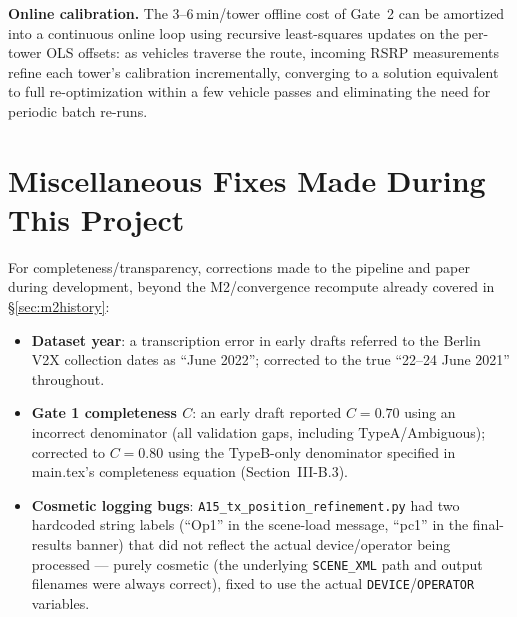 \documentclass[11pt]{article}
\begin{document}
\textbf{Online calibration.} The 3--6\,min/tower offline cost of Gate~2
can be amortized into a continuous online loop using recursive
least-squares updates on the per-tower OLS offsets: as vehicles traverse
the route, incoming RSRP measurements refine each tower's calibration
incrementally, converging to a solution equivalent to full
re-optimization within a few vehicle passes and eliminating the need
for periodic batch re-runs.

\section{Miscellaneous Fixes Made During This Project}
\label{sec:fixes}

For completeness/transparency, corrections made to the pipeline and
paper during development, beyond the M2/convergence recompute already
covered in \S\ref{sec:m2history}:

\begin{itemize}
  \item \textbf{Dataset year}: a transcription error in early drafts
        referred to the Berlin V2X collection dates as ``June 2022'';
        corrected to the true ``22--24 June 2021'' throughout.
  \item \textbf{Gate 1 completeness $C$}: an early draft reported
        $C=0.70$ using an incorrect denominator (all validation gaps,
        including TypeA/Ambiguous); corrected to $C=0.80$ using the
        TypeB-only denominator specified in main.tex's completeness
        equation (Section~III-B.3).
  \item \textbf{Cosmetic logging bugs}: \texttt{A15\_tx\_position\_refinement.py}
        had two hardcoded string labels (``Op1'' in the scene-load
        message, ``pc1'' in the final-results banner) that did not
        reflect the actual device/operator being processed — purely
        cosmetic (the underlying \texttt{SCENE\_XML} path and output
        filenames were always correct), fixed to use the actual
        \texttt{DEVICE}/\texttt{OPERATOR} variables.
\end{itemize}
\end{document}
